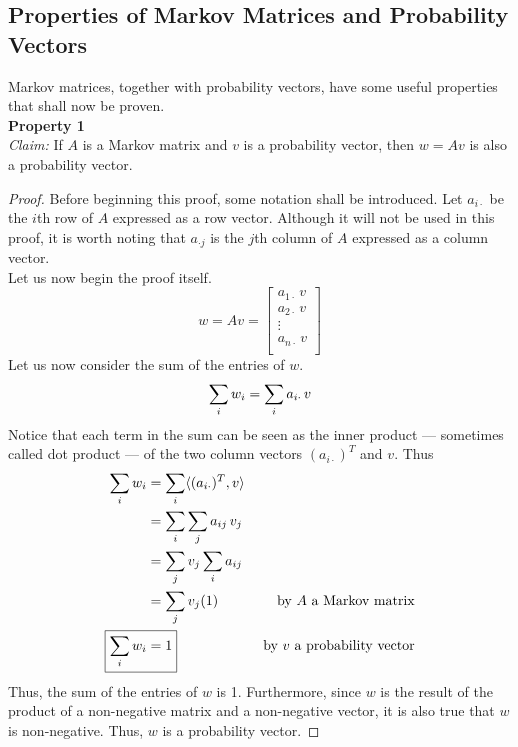 \documentclass[10pt]{article}
\begin{document}
\subsection{Properties of Markov Matrices and Probability Vectors}
Markov matrices, together with probability vectors, have some useful properties that shall now be proven.\vspace{0.5cm}\\
\textbf{Property 1}\\
\textit{Claim:} If $A$ is a Markov matrix and $v$ is a probability vector, then $w=Av$ is also a probability vector.
\begin{proof}
Before beginning this proof, some notation shall be introduced. Let $a_{i\cdot}$ be the $i$th row of $A$ expressed as a row vector. Although it will not be used in this proof, it is worth noting that $a_{\cdot j}$ is the $j$th column of $A$ expressed as a column vector.\vspace{0.5cm}\\
Let us now begin the proof itself.
\[w = Av = \left[\begin{array}{c}
     a_{1\cdot}\, v\\
     a_{2\cdot}\, v\\
     \vdots\\
     a_{n\cdot}\, v\\
\end{array}\right]\]
Let us now consider the sum of the entries of $w$.
\[\sum_{i} w_i = \sum_i a_{i\cdot} \, v\\\]
Notice that each term in the sum can be seen as the inner product --- sometimes called dot product --- of the two column vectors $(a_{i\cdot})^T$ and $v$. Thus
\begin{align*}
    \sum_{i} w_i &= \sum_{i} \langle(a_{i\cdot})^T, v\rangle\\
    &= \sum_{i}\sum_{j} a_{ij}\,v_j\\
    &= \sum_j v_j \sum_i a_{ij}\\
    &= \sum_j v_j (1) &\text{ by $A$ a Markov matrix}\\
    \Aboxed{\sum_{i} w_i &= 1} &\text{ by $v$ a probability vector}\\
\end{align*}
Thus, the sum of the entries of $w$ is 1. Furthermore, since $w$ is the result of the product of a non-negative matrix and a non-negative vector, it is also true that $w$ is non-negative. Thus, $w$ is a probability vector.
\end{proof}\vspace{0.5cm}
\end{document}
